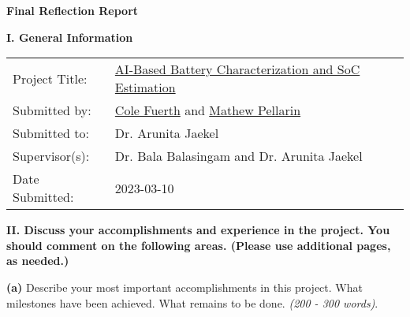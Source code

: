 \documentclass{article}
\begin{document}
{
\centering
\fontsize{16}{18}\selectfont
\textbf{Final Reflection Report}
\par
}

\vspace{0.5cm}
\raggedright

{
    \fontsize{12}{14}\selectfont
    \textbf{I. General Information}
    \par \vspace{0.1cm}
    \fontsize{12}{14}\selectfont
    \begin{tabular}{ll}
        Project Title:  & \href{https://github.com/colefuerth/AI-Characterization}{AI-Based Battery Characterization and SoC Estimation} \\
        Submitted by:   & \href{https://github.com/colefuerth/}{Cole Fuerth} and \href{https://github.com/Matp101}{Mathew Pellarin}      \\
        Submitted to:   & Dr. Arunita Jaekel                                                                                             \\
        Supervisor(s):  & Dr. Bala Balasingam and Dr. Arunita Jaekel                                                                     \\
        Date Submitted: & 2023-03-10                                                                                                     \\
    \end{tabular}
}

\vspace{0.5cm}

\fontsize{12}{14}\selectfont
\textbf{II. Discuss your accomplishments and experience in the project. You should comment on the following areas. (Please use additional pages, as needed.)}
\vspace{0.5cm}

\textbf{(a)} Describe your most important accomplishments in this project. What milestones have been achieved. What remains to be done. \textit{(200 - 300 words)}.


\vspace{0.5cm}
\end{document}
